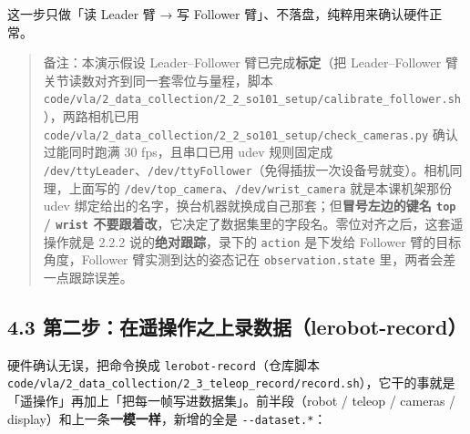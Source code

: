 \documentclass[
  chinese,
]{ctexart}
\begin{document}
这一步只做「读 Leader 臂 → 写 Follower
臂」、不落盘，纯粹用来确认硬件正常。

\begin{quote}
备注：本演示假设 Leader--Follower 臂已完成\textbf{标定}（把
Leader--Follower 臂关节读数对齐到同一套零位与量程，脚本
\texttt{code/vla/2\_data\_collection/2\_2\_so101\_setup/calibrate\_follower.sh}），两路相机已用
\texttt{code/vla/2\_data\_collection/2\_2\_so101\_setup/check\_cameras.py}
确认过能同时跑满 30 fps，且串口已用 udev 规则固定成
\texttt{/dev/ttyLeader}、\texttt{/dev/ttyFollower}（免得插拔一次设备号就变）。相机同理，上面写的
\texttt{/dev/top\_camera}、\texttt{/dev/wrist\_camera} 就是本课机架那份
udev 绑定给出的名字，换台机器就换成自己那套；但\textbf{冒号左边的键名
\texttt{top} / \texttt{wrist}
不要跟着改}，它决定了数据集里的字段名。零位对齐之后，这套遥操作就是
2.2.2 说的\textbf{绝对跟踪}，录下的 \texttt{action} 是下发给 Follower
臂的目标角度，Follower 臂实测到达的姿态记在 \texttt{observation.state}
里，两者会差一点跟踪误差。
\end{quote}

\subsection{4.3
第二步：在遥操作之上录数据（lerobot-record）}\label{ux7b2cux4e8cux6b65ux5728ux9065ux64cdux4f5cux4e4bux4e0aux5f55ux6570ux636elerobot-record}

硬件确认无误，把命令换成 \texttt{lerobot-record}（仓库脚本
\texttt{code/vla/2\_data\_collection/2\_3\_teleop\_record/record.sh}），它干的事就是「遥操作」再加上「把每一帧写进数据集」。前半段（robot
/ teleop / cameras / display）和上一条\textbf{一模一样}，新增的全是
\texttt{-\/-dataset.*}：
\end{document}
